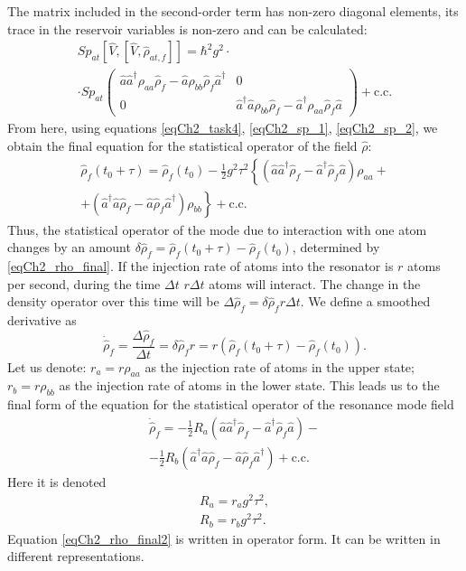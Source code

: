 The matrix included in the second-order term has non-zero diagonal elements, its trace in the reservoir variables is non-zero and can be calculated: 
\begin{eqnarray}
Sp_{at}\left[\hat{V},\left[\hat{V}, \hat{\rho}_{at, f}\right] \right]
= \hbar^2 g^2 \cdot
\nonumber \\
\cdot Sp_{at}
\left(
\begin{array} {cc}
\hat{a} \hat{a}^{\dag}\rho_{aa} \hat{\rho}_{f} -
\hat{a}\rho_{bb} \hat{\rho}_{f}\hat{a}^{\dag}  & 0
\\
0 & 
\hat{a}^{\dag} \hat{a}\rho_{bb} \hat{\rho}_{f} -
\hat{a}^{\dag}\rho_{aa} \hat{\rho}_{f}\hat{a} 
\end{array}
\right) + \mbox{c.c.} 
\label{eqCh2_sp_2}
\end{eqnarray}
From here, using equations \eqref{eqCh2_task4}, \eqref{eqCh2_sp_1}, \eqref{eqCh2_sp_2}, we obtain the final equation for the statistical operator of the field $\hat{\rho}$:  
\begin{eqnarray}
\hat{\rho}_{f}\left(t_0 + \tau\right) =
\hat{\rho}_{f}\left(t_0\right) - \frac{1}{2}g^2 \tau^2
\left\{
\left(\hat{a}\hat{a}^{\dag}\hat{\rho}_{f} - 
\hat{a}^{\dag}\hat{\rho}_{f}\hat{a}
\right)\rho_{aa} +
\right.
\nonumber \\
\left.
+
\left(\hat{a}^{\dag}\hat{a}\hat{\rho}_{f} - 
\hat{a}\hat{\rho}_{f}\hat{a}^{\dag}
\right)\rho_{bb}
\right\} + \mbox{c.c.}
\label{eqCh2_rho_final}
\end{eqnarray}
Thus, the statistical operator of the mode due to interaction with one atom changes by an amount 
\(
\delta\hat{\rho}_{f}=
\hat{\rho}_{f}\left(t_0 + \tau\right) -
\hat{\rho}_{f}\left(t_0\right)
\), determined by \eqref{eqCh2_rho_final}. If the injection rate of atoms into the resonator is $r$ atoms per second, during the time $\Delta t$ $r \Delta t$ atoms will interact. The change in the density operator over this time will be 
$\Delta \hat{\rho}_{f} = \delta\hat{\rho}_{f}r \Delta t$. We define a smoothed derivative as 
\[
\dot{\hat{\rho}}_{f} = \frac{\Delta \hat{\rho}_{f}}{\Delta t} = 
\delta\hat{\rho}_{f} r = r 
\left(
\hat{\rho}_{f}\left(t_0 + \tau\right) -
\hat{\rho}_{f}\left(t_0\right)
\right).
\]
Let us denote: $r_a = r \rho_{aa}$ as the injection rate of atoms in the upper state; $r_b = r \rho_{bb}$ as the injection rate of atoms in the lower state. This leads us to the final form of the equation for the statistical operator of the resonance mode field 
\begin{eqnarray}
\dot{\hat{\rho}}_{f} =
- \frac{1}{2}R_a
\left(\hat{a}\hat{a}^{\dag}\hat{\rho}_{f} - 
\hat{a}^{\dag}\hat{\rho}_{f}\hat{a}
\right)
- 
\nonumber \\
- \frac{1}{2}R_b
\left(\hat{a}^{\dag}\hat{a}\hat{\rho}_{f} - 
\hat{a}\hat{\rho}_{f}\hat{a}^{\dag}
\right)
 + \mbox{c.c.}
\label{eqCh2_rho_final2}
\end{eqnarray}
Here it is denoted 
\begin{eqnarray}
R_a=r_a g^2\tau^2,
\nonumber \\
R_b=r_b g^2\tau^2.
\label{eqCh2_RaRbDefenition}
\end{eqnarray}
Equation \eqref{eqCh2_rho_final2} is written in operator form. It can be written in different representations.   